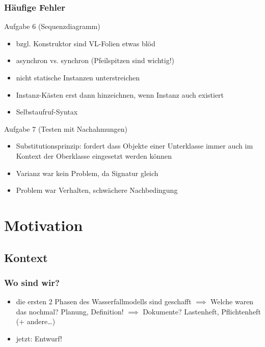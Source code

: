 \documentclass[18pt]{beamer}
\begin{document}
	\begin{frame}
		\frametitle{Häufige Fehler}
		\begin{block}{Aufgabe 6 (Sequenzdiagramm)}
			\begin{itemize}
				\pause 
				\item bzgl. Konstruktor sind VL-Folien etwas blöd \pause
				\item asynchron vs. synchron (Pfeilspitzen sind wichtig!) \pause
				\item nicht statische Instanzen unterstreichen \pause
				\item Instanz-Kästen erst dann hinzeichnen, wenn Instanz auch existiert \pause
				\item Selbstaufruf-Syntax
			\end{itemize}
		\end{block}
		\begin{block}{Aufgabe 7 (Testen mit Nachahmungen)}
			\begin{itemize}
				\pause
				\item Substitutionsprinzip: fordert dass Objekte einer Unterklasse immer auch im Kontext der Oberklasse eingesetzt werden können \pause
				\item Varianz war kein Problem, da Signatur gleich \pause
				\item Problem war Verhalten, schwächere Nachbedingung \pause
			\end{itemize}
		\end{block}
	\end{frame}



\section{Motivation}
	\subsection{Kontext}
		\begin{frame}
			\frametitle{Wo sind wir?}
			\begin{itemize}
				\item die ersten 2 Phasen des Wasserfallmodells sind geschafft
				\pause
				\linebreak $\implies$ Welche waren das nochmal? \pause Planung, Definition!
				\pause
				\linebreak $\implies$ Dokumente? \pause Lastenheft, Pflichtenheft (+ andere\dots)
				\pause
				\item  jetzt: Entwurf!
			\end{itemize}
		\end{frame}
	
\end{document}
